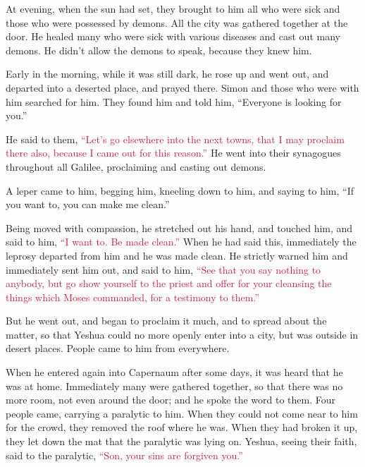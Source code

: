 \myverse{}At evening, when the sun had set, they brought to him all who
were sick and those who were possessed by demons.
\myverse{}All the city was gathered together at the door.
\myverse{}He healed many who were sick with various diseases and cast out many demons.
He didn’t allow the demons to speak, because they knew him.

\myverse{}Early in the morning, while it was still dark, he rose up and
went out, and departed into a deserted place, and prayed there.
\myverse{}Simon and those who were with him searched for him.
\myverse{}They found him and told him, “Everyone is looking for you.”

\myverse{}He said to them,
\textcolor{crimson}{“Let’s go elsewhere into the next towns, that I may proclaim there also, because I came out for this
	reason.”}
\myverse{}He went into their synagogues throughout all Galilee, proclaiming and casting
out demons.

\myverse{}A leper came to him, begging him, kneeling down to him, and saying
to him, “If you want to, you can make me clean.”

\myverse{}Being moved with compassion, he stretched out his hand, and touched
him, and said to him,
\textcolor{crimson}{“I want to. Be made clean.”}
\myverse{}When he had said this, immediately the leprosy departed from him and he was
made clean.
\myverse{}He strictly warned him and immediately sent him out,
\myverse{}and said to him,
\textcolor{crimson}{“See that you say nothing to anybody, but go show yourself to the priest and offer for your cleansing
	the things which Moses commanded, for a testimony to them.”}

\myverse{}But he went out, and began to proclaim it much, and to spread
about the matter, so that Yeshua could no more openly enter into a city, but was outside in desert places.
People came to him from everywhere.


\mychapter{} \myverse*{}When he entered again into Capernaum after some days, it was heard
that he was at home.
\myverse{}Immediately many were gathered together, so that there was no more room, not
even around the door; and he spoke the word to them.
\myverse{}Four people came, carrying a paralytic to him.
\myverse{}When they could not come near to him for the crowd, they removed the roof where
he was. When they had broken it up, they let down the mat that the paralytic was lying on.
\myverse{}Yeshua, seeing their faith, said to the paralytic,
\textcolor{crimson}{“Son, your sins are forgiven you.”}

